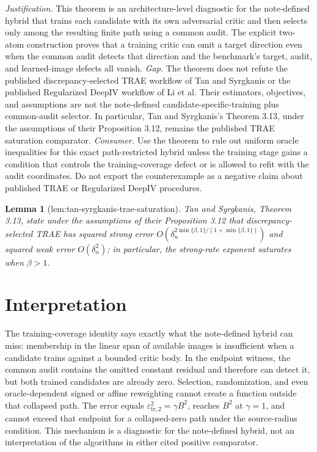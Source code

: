\documentclass{article}
\newtheorem{lemma}{Lemma}
\begin{document}
\par\smallskip\noindent \textit{Justification.} This theorem is an architecture-level diagnostic for the note-defined hybrid that trains each candidate with its own adversarial critic and then selects only among the resulting finite path using a common audit. The explicit two-atom construction proves that a training critic can omit a target direction even when the common audit detects that direction and the benchmark's target, audit, and learned-image defects all vanish. \textit{Gap.} The theorem does not refute the published discrepancy-selected TRAE workflow of Tan and Syrgkanis or the published Regularized DeepIV workflow of Li et al. Their estimators, objectives, and assumptions are not the note-defined candidate-specific-training plus common-audit selector. In particular, Tan and Syrgkanis's Theorem 3.13, under the assumptions of their Proposition 3.12, remains the published TRAE saturation comparator. \textit{Consumer.} Use the theorem to rule out uniform oracle inequalities for this exact path-restricted hybrid unless the training stage gains a condition that controls the training-coverage defect or is allowed to refit with the audit coordinates. Do not export the counterexample as a negative claim about published TRAE or Regularized DeepIV procedures.

\begin{lemma}[lem:tan-syrgkanis-trae-saturation]\label{lem:tan-syrgkanis-trae-saturation}
Tan and Syrgkanis, Theorem 3.13, state under the assumptions of their Proposition 3.12 that discrepancy-selected TRAE has squared strong error \(O(\delta_n^{2\min\{\beta,1\}/(1+\min\{\beta,1\})})\) and squared weak error \(O(\delta_n^2)\); in particular, the strong-rate exponent saturates when \(\beta>1\).
\end{lemma}

\section{Interpretation}

The training-coverage identity says exactly what the note-defined hybrid can miss: membership in the linear span of available images is insufficient when a candidate trains against a bounded critic body. In the endpoint witness, the common audit contains the omitted constant residual and therefore can detect it, but both trained candidates are already zero. Selection, randomization, and even oracle-dependent signed or affine reweighting cannot create a function outside that collapsed path. The error equals \(\varepsilon_{\mathrm{tr},2}^2=\gamma B^2\), reaches \(B^2\) at \(\gamma=1\), and cannot exceed that endpoint for a collapsed-zero path under the source-radius condition. This mechanism is a diagnostic for the note-defined hybrid, not an interpretation of the algorithms in either cited positive comparator.
\end{document}
